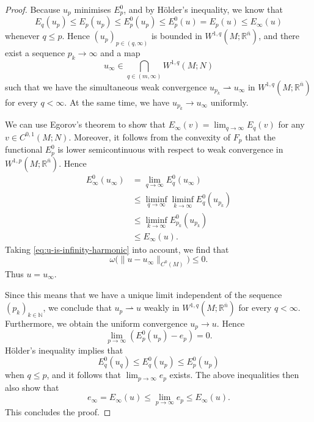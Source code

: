 \documentclass[10pt,a4paper]{amsart}
\newcommand{\R}{\mathbb{R}}
\newcommand{\N}{\mathbb{N}}
\newcommand{\ndim}{{\bar{n}}}
\begin{document}
\begin{proof}
Because $u_p$ minimises $E_p^0$, and by H\"older's inequality, we know that
\[
E_q(u_p) \le E_p(u_p) \le E_p^0(u_p) \le E_p^0(u) = E_p(u) \le E_\infty(u)
\]
whenever $q \le p$. Hence $(u_p)_{p \in (q, \infty)}$ is bounded in $W^{1, q}(M; \R^\ndim)$, and there exist a sequence $p_k \to \infty$ and a map
\[
u_\infty \in \bigcap_{q \in (m, \infty)} W^{1, q}(M; N)
\]
such that we have the simultaneous weak convergence $u_{p_k} \rightharpoonup u_\infty$
in $W^{1, q}(M; \R^\ndim)$ for every $q < \infty$.
At the same time, we have $u_{p_k} \to u_\infty$ uniformly.

We can use Egorov's theorem to show that $E_\infty(v) = \lim_{q \to \infty} E_q(v)$
for any $v \in C^{0, 1}(M; N)$. Moreover, it follows from the convexity of
$F_p$ that the functional $E_p^0$ is lower
semicontinuous with respect to weak convergence in $W^{1, p}(M; \R^\ndim)$.
Hence
\[
\begin{split}
E_\infty^0(u_\infty) & = \lim_{q \to \infty} E_q^0(u_\infty) \\
& \le \liminf_{q \to \infty} \liminf_{k \to \infty} E_q^0(u_{p_k}) \\
& \le \liminf_{k \to \infty} E_{p_k}^0(u_{p_k}) \\
& \le E_\infty(u).
\end{split}
\]
Taking \eqref{eq:u-is-infinity-harmonic} into account, we find that
\[
\omega\bigl(\|u - u_\infty\|_{C^0(M)}\bigr) \le 0.
\]
Thus $u = u_\infty$.

Since this means that we have a unique limit independent of the sequence $(p_k)_{k \in \N}$, we conclude that $u_p \rightharpoonup u$ weakly in
$W^{1, q}(M; \R^\ndim)$ for every $q < \infty$. Furthermore, we obtain the uniform convergence
$u_p \to u$. Hence
\[
\lim_{p \to \infty} \left(E_p^0(u_p) - e_p\right) = 0.
\]
H\"older's inequality implies that
\[
E_q^0(u_q) \le E_q^0(u_p) \le E_p^0(u_p)
\]
when $q \le p$, and it follows that $\lim_{p \to \infty} e_p$ exists.
The above inequalities then also show that
\[
e_\infty = E_\infty(u) \le \lim_{p \to \infty} e_p \le E_\infty(u).
\]
This concludes the proof.
\end{proof}
\end{document}
